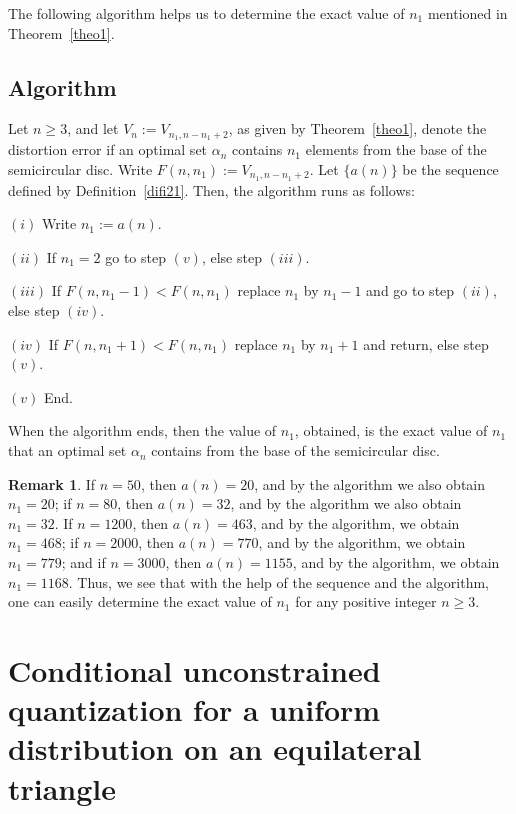 \documentclass[12pt, reqno]{amsart}
\theoremstyle{plain}
\theoremstyle{definition}
\newtheorem{remark}[subsection]{Remark}
\newcommand{\set}[1]{\{#1\}}%
\newcommand{\ga}{\alpha}
\begin{document}
The following algorithm helps us to determine the exact value of $n_1$ mentioned in Theorem~\ref{theo1}.
\subsection{Algorithm}  Let $n\geq 3$, and let $V_n:=V_{n_1, n-n_1+2}$, as given by Theorem~\ref{theo1}, denote the distortion error if an optimal set $\ga_n$ contains $n_1$ elements from the base of the semicircular disc. Write $F(n, n_1):=V_{n_1, n-n_1+2}$. Let $\set{a(n)}$ be the sequence  defined by Definition~\ref{difi21}. Then, the algorithm runs as follows:

$(i)$ Write $n_1:=a(n)$.

$(ii)$ If $n_1=2$ go to step $(v)$, else step $(iii)$.

$(iii)$ If $F(n, n_1-1)<F(n, n_1)$ replace $n_1$ by $n_1-1$ and go to step $(ii)$, else step $(iv)$.

$(iv)$ If $F(n, n_1+1)<F(n, n_1)$ replace $n_1$ by $n_1+1$ and return, else step $(v)$.

$(v)$ End.

When the algorithm ends, then the value of $n_1$, obtained, is the exact value of $n_1$ that an optimal set $\ga_n$ contains from the base of the semicircular disc.
\begin{remark}
If $n=50$, then $a(n)=20$, and by the algorithm we also obtain $n_1=20$; if $n=80$, then $a(n)=32$, and by the algorithm we also obtain $n_1=32$. If $n=1200$, then  $a(n)=463$, and by the algorithm, we obtain $n_1=468$; if $n=2000$, then $a(n)=770$, and by the algorithm, we obtain $n_1=779$; and if $n=3000$, then $a(n)=1155$, and by the algorithm, we obtain $n_1=1168$. Thus, we see that with the help of the sequence and the algorithm, one can easily determine the exact value of $n_1$ for any positive integer $n\geq 3$.
\end{remark}




 \section{Conditional unconstrained quantization for a uniform distribution on an equilateral triangle} \label{secMe4}
\end{document}
